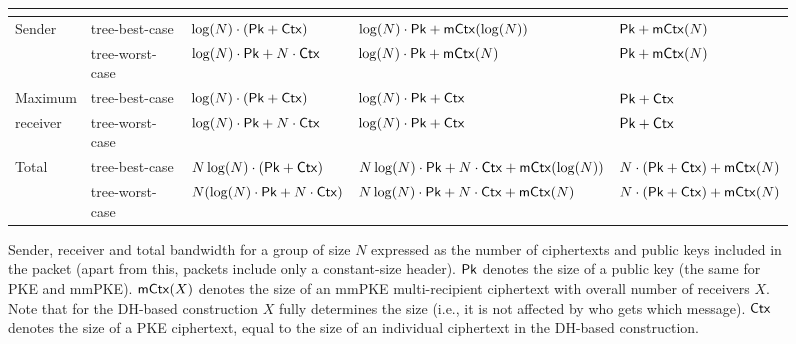 \newcommand{\ctxSize}{\variable{Ctx}}
\newcommand{\mCtxSize}{\variable{mCtx}}
\newcommand{\pkSize}{\variable{Pk}}
\begin{figure}[!p]
	\begin{minipage}[t]{\textwidth}\centering
	\begin{tabular}{|l|l|l|l|l|}
		\hline
		\multicolumn{2}{|c|}{}& \protITK & \saik & \protCMPKE \\
		\hline
		\multirow{2}{*}{Sender} 
		& tree-best-case & $\log(N)\cdot (\pkSize + \ctxSize)$ & $\log(N) \cdot \pkSize + \mCtxSize(\log(N))$ & $\pkSize + \mCtxSize(N)$ \\\cline{2-5}
		& tree-worst-case & $\log(N)\cdot\pkSize + N\cdot \ctxSize$ & $\log(N) \cdot \pkSize + \mCtxSize(N)$ & $\pkSize + \mCtxSize(N)$ \\\hline
		Maximum
		& tree-best-case & $\log(N)\cdot (\pkSize + \ctxSize)$  & $\log(N) \cdot \pkSize + \ctxSize$  & $\pkSize + \ctxSize$ \\\cline{2-5}
		receiver & tree-worst-case &  $\log(N)\cdot\pkSize + N\cdot \ctxSize$ & $\log(N) \cdot \pkSize + \ctxSize$  & $\pkSize + \ctxSize$ \\
		\hline
		\multirow{2}{*}{Total} 
		& tree-best-case & $N\log(N)\cdot (\pkSize + \ctxSize)$  & $N\log(N) \cdot \pkSize + N\cdot\ctxSize + \mCtxSize(\log(N))$   & $N\cdot(\pkSize + \ctxSize) + \mCtxSize(N)$ \\\cline{2-5}
		& tree-worst-case &  $N(\log(N)\cdot\pkSize + N\cdot \ctxSize)$ & $N\log(N) \cdot \pkSize + N\cdot\ctxSize + \mCtxSize(N)$  & $N\cdot(\pkSize + \ctxSize) + \mCtxSize(N)$ \\
		\hline
	\end{tabular}
	\caption{Sender, receiver and total bandwidth for a group of size $N$ expressed as the number of ciphertexts and public keys included in the packet (apart from this, packets include only a constant-size header).
		$\pkSize$ denotes the size of a public key (the same for PKE and mmPKE). $\mCtxSize(X)$ denotes the size of an mmPKE multi-recipient ciphertext with overall number of receivers $X$. Note that for the DH-based construction $X$ fully determines the size (i.e., it is not affected by who gets which message). $\ctxSize$ denotes the size of a PKE ciphertext, equal to the size of an individual ciphertext in the DH-based construction.
	}
	\label{tab:bandwidth1}
\end{minipage}
  \begin{minipage}[t]{.48\textwidth}

\end{minipage}
\end{figure}
